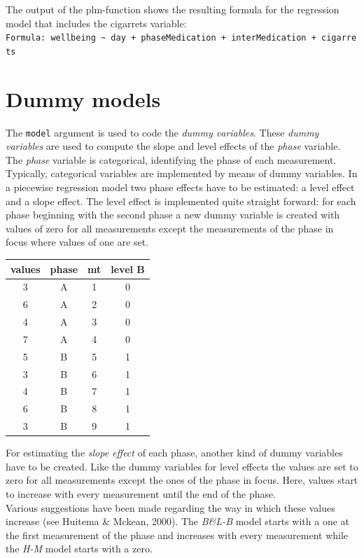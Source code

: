 \documentclass[
  letterpaper,
  DIV=11,
  numbers=noendperiod]{scrreprt}
\begin{document}
The output of the plm-function shows the resulting formula for the
regression model that includes the cigarrets variable:\\
\texttt{Formula:\ wellbeing\ \textasciitilde{}\ day\ +\ phaseMedication\ +\ interMedication\ +\ cigarrets}

\hypertarget{dummy-models}{%
\section{Dummy models}\label{dummy-models}}

The \texttt{model} argument is used to code the \emph{dummy variables}.
These \emph{dummy variables} are used to compute the slope and level
effects of the \emph{phase} variable.\\
The \emph{phase} variable is categorical, identifying the phase of each
measurement. Typically, categorical variables are implemented by means
of dummy variables. In a piecewise regression model two phase effects
have to be estimated: a level effect and a slope effect. The level
effect is implemented quite straight forward: for each phase beginning
with the second phase a new dummy variable is created with values of
zero for all measurements except the measurements of the phase in focus
where values of one are set.

\begin{longtable}[]{@{}cccc@{}}
\toprule()
values & phase & mt & level B \\
\midrule()
\endhead
3 & A & 1 & 0 \\
6 & A & 2 & 0 \\
4 & A & 3 & 0 \\
7 & A & 4 & 0 \\
5 & B & 5 & 1 \\
3 & B & 6 & 1 \\
4 & B & 7 & 1 \\
6 & B & 8 & 1 \\
3 & B & 9 & 1 \\
\bottomrule()
\end{longtable}

For estimating the \emph{slope effect} of each phase, another kind of
dummy variables have to be created. Like the dummy variables for level
effects the values are set to zero for all measurements except the ones
of the phase in focus. Here, values start to increase with every
measurement until the end of the phase.\\
Various suggestions have been made regarding the way in which these
values increase (see Huitema \& Mckean, 2000). The \emph{B\&L-B} model
starts with a one at the first measurement of the phase and increases
with every measurement while the \emph{H-M} model starts with a zero.
\end{document}
